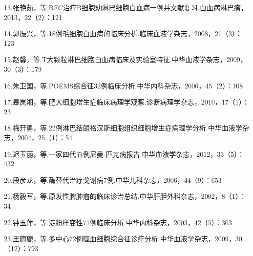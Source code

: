 13.张艳茹，等.RFC治疗B细胞幼淋巴细胞白血病一例并文献复习.白血病淋巴瘤，2013，22（2）：121

14.郭振兴，等.18例毛细胞白血病的临床分析.临床血液学杂志，2008，21（3）：123

15.赵馨，等.T大颗粒淋巴细胞白血病临床及实验室特征.中华血液学杂志，2009，30（3）：179

16.朱卫国，等.POEMS综合征32例临床分析.中华内科杂志，2006，45（2）：108

17.皋岚湘，等.肥大细胞增生症临床病理学观察.诊断病理学杂志，2010，17（1）：23

18.梅开勇，等.22例淋巴结朗格汉斯细胞组织细胞增生症病理学分析.中华血液学杂志，2004，25（1）：54

19.迟玉丽，等.一家四代五例尼曼-匹克病报告.中华血液学杂志，2012，33（5）：432

20.段彦龙，等.酶替代治疗戈谢病7例.中华儿科杂志，2006，44（9）：653

21.杨毅军，等.原发性脾肿瘤的临床诊治总结.中华肝胆外科杂志，2002，8（1）：34

22.钟玉萍，等.淀粉样变性71例临床分析.中华内科杂志，2003，42（5）：303

23.王旖旎，等.多中心72例噬血细胞综合征诊疗分析.中华血液学杂志，2009，30（12）：793

\protect\hypertarget{text00252.html}{}{}

